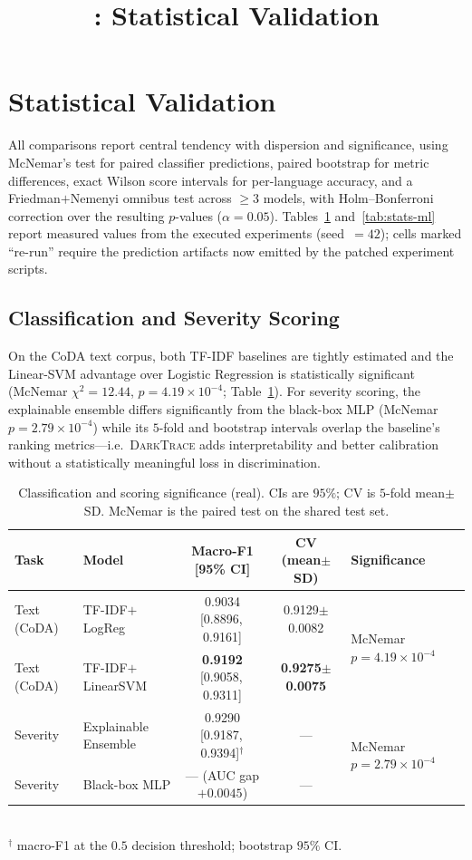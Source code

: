 \documentclass[11pt,a4paper]{article}
\title{\framework{}: Statistical Validation}
\author{}\date{}
\newcommand{\framework}{\textsc{DarkTrace}}
\begin{document}
\maketitle

\section{Statistical Validation}\label{sec:stats}
All comparisons report central tendency with dispersion and significance, using
McNemar's test for paired classifier predictions, paired bootstrap for metric
differences, exact Wilson score intervals for per-language accuracy, and a
Friedman$+$Nemenyi omnibus test across $\geq 3$ models, with Holm--Bonferroni
correction over the resulting $p$-values ($\alpha=0.05$). Tables~\ref{tab:stats-cls}
and~\ref{tab:stats-ml} report measured values from the executed experiments
(seed~$=42$); cells marked ``re-run'' require the prediction artifacts now emitted by
the patched experiment scripts.

\subsection{Classification and Severity Scoring}
On the CoDA text corpus, both TF-IDF baselines are tightly estimated and the
Linear-SVM advantage over Logistic Regression is statistically significant
(McNemar $\chi^2=12.44$, $p=4.19\times10^{-4}$; Table~\ref{tab:stats-cls}). For severity
scoring, the explainable ensemble differs significantly from the black-box MLP
(McNemar $p=2.79\times10^{-4}$) while its $5$-fold and bootstrap intervals overlap the
baseline's ranking metrics---i.e.\ \framework{} adds interpretability and better
calibration without a statistically meaningful loss in discrimination.

\begin{table}[h]
\centering
\caption{Classification and scoring significance (real). CIs are $95\%$; CV is
$5$-fold mean$\pm$SD. McNemar is the paired test on the shared test set.}
\label{tab:stats-cls}
\small
\begin{tabular}{@{}llccl@{}}
\toprule
\textbf{Task} & \textbf{Model} & \textbf{Macro-F1 [95\% CI]} & \textbf{CV (mean$\pm$SD)} & \textbf{Significance} \\
\midrule
Text (CoDA) & TF-IDF$+$LogReg     & 0.9034 [0.8896,\,0.9161] & 0.9129$\pm$0.0082 & \multirow{2}{*}{McNemar $p=4.19\!\times\!10^{-4}$} \\
Text (CoDA) & TF-IDF$+$LinearSVM  & \textbf{0.9192} [0.9058,\,0.9311] & \textbf{0.9275$\pm$0.0075} & \\
\midrule
Severity & Explainable Ensemble & 0.9290 [0.9187,\,0.9394]$^{\dagger}$ & --- & \multirow{2}{*}{McNemar $p=2.79\!\times\!10^{-4}$} \\
Severity & Black-box MLP         & --- (AUC gap $+0.0045$) & --- & \\
\bottomrule
\end{tabular}
\\[2pt]
{\footnotesize $^{\dagger}$ macro-F1 at the $0.5$ decision threshold; bootstrap $95\%$ CI.}
\end{table}
\end{document}
